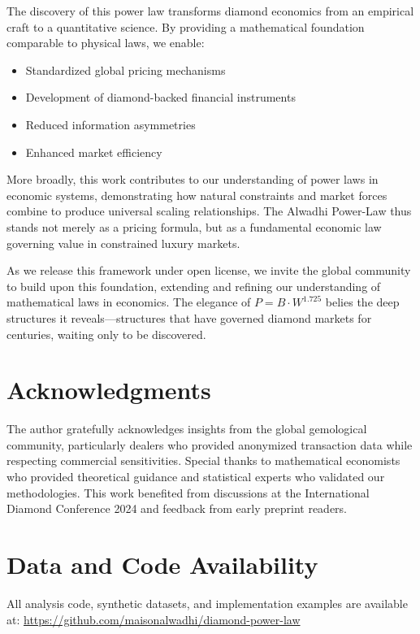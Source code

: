 \documentclass[12pt,a4paper]{article}
\theoremstyle{definition}
\theoremstyle{remark}
\begin{document}
The discovery of this power law transforms diamond economics from an empirical craft to a quantitative science. By providing a mathematical foundation comparable to physical laws, we enable:

\begin{itemize}
\item Standardized global pricing mechanisms
\item Development of diamond-backed financial instruments
\item Reduced information asymmetries
\item Enhanced market efficiency
\end{itemize}

More broadly, this work contributes to our understanding of power laws in economic systems, demonstrating how natural constraints and market forces combine to produce universal scaling relationships. The Alwadhi Power-Law thus stands not merely as a pricing formula, but as a fundamental economic law governing value in constrained luxury markets.

As we release this framework under open license, we invite the global community to build upon this foundation, extending and refining our understanding of mathematical laws in economics. The elegance of $P = B \cdot W^{1.725}$ belies the deep structures it reveals—structures that have governed diamond markets for centuries, waiting only to be discovered.

\section*{Acknowledgments}

The author gratefully acknowledges insights from the global gemological community, particularly dealers who provided anonymized transaction data while respecting commercial sensitivities. Special thanks to mathematical economists who provided theoretical guidance and statistical experts who validated our methodologies. This work benefited from discussions at the International Diamond Conference 2024 and feedback from early preprint readers.

\section*{Data and Code Availability}

All analysis code, synthetic datasets, and implementation examples are available at: \url{https://github.com/maisonalwadhi/diamond-power-law}
\end{document}
